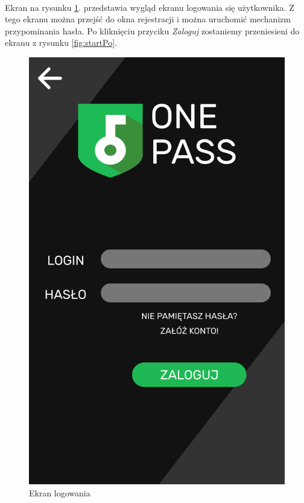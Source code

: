 \documentclass[a4paper]{article}
\begin{document}
\paragraph{}Ekran na rysunku \ref{fig:logowanie}. przedstawia wygląd ekranu logowania się użytkownika. Z tego ekranu można przejść do okna rejestracji i można uruchomić mechanizm przypominania hasła. Po kliknięciu przyciku \textit{Zaloguj} zostaniemy przeniesieni do ekranu z rysunku \ref{fig:startPo}.
\begin{figure}[H]
    \centering
    \includegraphics[height = 1\textwidth]{img/ekran_logowania.png}
    \caption{Ekran logowania}
    \label{fig:logowanie}
\end{figure}

\newpage
\end{document}
